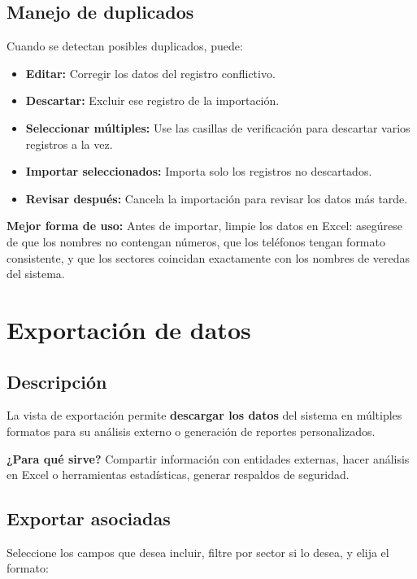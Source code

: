 \documentclass[12pt]{article}
\begin{document}
\subsection{Manejo de duplicados}
Cuando se detectan posibles duplicados, puede:

\begin{itemize}[nosep]
  \item \textbf{Editar:} Corregir los datos del registro conflictivo.
  \item \textbf{Descartar:} Excluir ese registro de la importación.
  \item \textbf{Seleccionar múltiples:} Use las casillas de verificación para descartar varios registros a la vez.
  \item \textbf{Importar seleccionados:} Importa solo los registros no descartados.
  \item \textbf{Revisar después:} Cancela la importación para revisar los datos más tarde.
\end{itemize}

\begin{tipbox}
  \textbf{Mejor forma de uso:} Antes de importar, limpie los datos en Excel: asegúrese de que los nombres no contengan números, que los teléfonos tengan formato consistente, y que los sectores coincidan exactamente con los nombres de veredas del sistema.
\end{tipbox}

\section{Exportación de datos}
\label{sec:exportar}

\subsection{Descripción}
\label{subsec:exportar-descripcion}

La vista de exportación permite \textbf{descargar los datos} del sistema en múltiples formatos para su análisis externo o generación de reportes personalizados.

\begin{infobox}
  \textbf{¿Para qué sirve?} Compartir información con entidades externas, hacer análisis en Excel o herramientas estadísticas, generar respaldos de seguridad.
\end{infobox}

\subsection{Exportar asociadas}
Seleccione los campos que desea incluir, filtre por sector si lo desea, y elija el formato:
\end{document}
